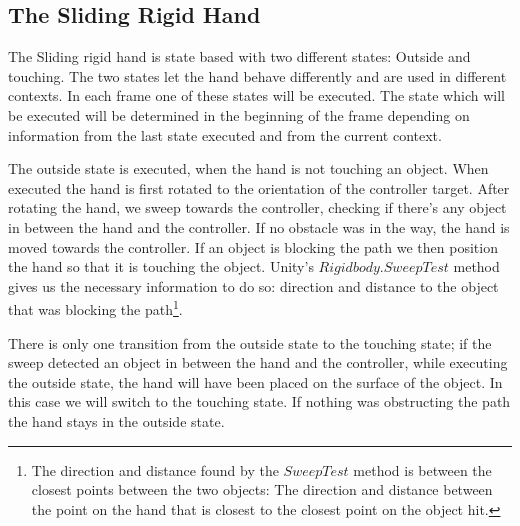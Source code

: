 \subsection{The Sliding Rigid Hand}
\label{subsec:slidingRigidHand}
The Sliding rigid hand is state based with two different states: Outside and touching. The two states let the hand behave differently and are used in different contexts. In each frame one of these states will be executed. The state which will be executed will be determined in the beginning of the frame depending on information from the last state executed and from the current context.


The outside state is executed, when the hand is not touching an object. When executed the hand is first rotated to the orientation of the controller target. After rotating the hand, we sweep towards the controller, checking if there's any object in between the hand and the controller. If no obstacle was in the way, the hand is moved towards the controller. If an object is blocking the path we then position the hand so that it is touching the object. Unity's $Rigidbody.SweepTest$ method gives us the necessary information to do so: direction and distance to the object that was blocking the path\footnote{The direction and distance found by the $SweepTest$ method is between the closest points between the two objects: The direction and distance between the point on the hand that is closest to the closest point on the object hit.}.

There is only one transition from the outside state to the touching state; if the sweep detected an object in between the hand and the controller, while executing the outside state, the hand will have been placed on the surface of the object. In this case we will switch to the touching state. If nothing was obstructing the path the hand stays in the outside state.

